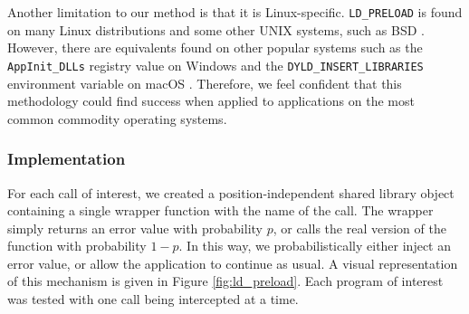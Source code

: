 Another limitation to our method is that it is Linux-specific. \texttt{LD\_PRELOAD} is found on many Linux distributions and some other UNIX systems, such as BSD \cite{bsd}. However, there are equivalents found on other popular systems such as the \texttt{AppInit\_DLLs} registry value on Windows \cite{dll} and the \texttt{DYLD\_INSERT\_LIBRARIES} environment variable on macOS \cite{macos}. Therefore, we feel confident that this methodology could find success when applied to applications on the most common commodity operating systems.

\subsubsection{Implementation}\label{ld_preload_implementation}
For each call of interest, we created a position-independent shared library object containing a single wrapper function with the name of the call. The wrapper simply returns an error value with probability $p$, or calls the real version of the function with probability $1-p$. In this way, we probabilistically either inject an error value, or allow the application to continue as usual. A visual representation of this mechanism is given in Figure \ref{fig:ld_preload}. Each program of interest was tested with one call being intercepted at a time.

